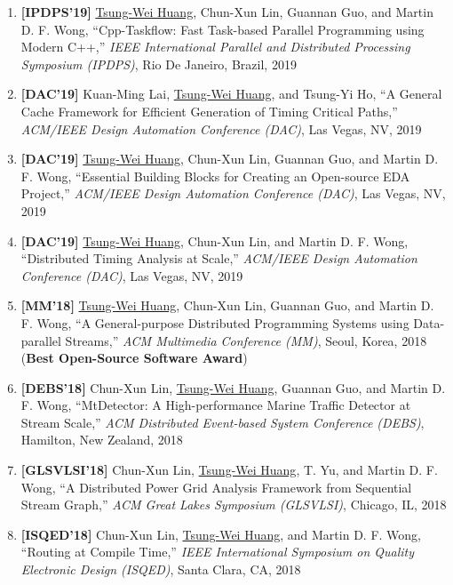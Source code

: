 \documentclass[A4,11pt]{article}
\begin{document}
\begin{enumerate}
    \item \textbf{[IPDPS'19]} \underline{Tsung-Wei Huang}, Chun-Xun Lin, Guannan Guo, and Martin D. F. Wong, ``Cpp-Taskflow: Fast Task-based Parallel Programming using Modern C++,'' \textit{IEEE International Parallel and Distributed Processing Symposium (IPDPS)}, Rio De Janeiro, Brazil, 2019

    \item \textbf{[DAC'19]} Kuan-Ming Lai, \underline{Tsung-Wei Huang}, and Tsung-Yi Ho, ``A General Cache Framework for Efficient Generation of Timing Critical Paths,'' \textit{ACM/IEEE Design Automation Conference (DAC)}, Las Vegas, NV, 2019

    \item \textbf{[DAC'19]} \underline{Tsung-Wei Huang}, Chun-Xun Lin, Guannan Guo, and Martin D. F. Wong, ``Essential Building Blocks for Creating an Open-source EDA Project,'' \textit{ACM/IEEE Design Automation Conference (DAC)}, Las Vegas, NV, 2019

    \item \textbf{[DAC'19]} \underline{Tsung-Wei Huang}, Chun-Xun Lin, and Martin D. F. Wong, ``Distributed Timing Analysis at Scale,'' \textit{ACM/IEEE Design Automation Conference (DAC)}, Las Vegas, NV, 2019

    \item \textbf{[MM'18]} \underline{Tsung-Wei Huang}, Chun-Xun Lin, Guannan Guo, and Martin D. F. Wong, ``A General-purpose Distributed Programming Systems using Data-parallel Streams,'' \textit{ACM Multimedia Conference (MM)}, Seoul, Korea, 2018 (\textbf{Best Open-Source Software Award}) 

    \item \textbf{[DEBS'18]} Chun-Xun Lin, \underline{Tsung-Wei Huang}, Guannan Guo, and Martin D. F. Wong, ``MtDetector: A High-performance Marine Traffic Detector at Stream Scale,'' \textit{ACM Distributed Event-based System Conference (DEBS)}, Hamilton, New Zealand, 2018

    \item \textbf{[GLSVLSI'18]} Chun-Xun Lin, \underline{Tsung-Wei Huang}, T. Yu, and Martin D. F. Wong, ``A Distributed Power Grid Analysis Framework from Sequential Stream Graph,'' \textit{ACM Great Lakes Symposium (GLSVLSI)}, Chicago, IL, 2018

    \item \textbf{[ISQED'18]} Chun-Xun Lin, \underline{Tsung-Wei Huang}, and Martin D. F. Wong, ``Routing at Compile Time,'' \textit{IEEE International Symposium on Quality Electronic Design (ISQED)}, Santa Clara, CA, 2018


\end{enumerate}
\end{document}
